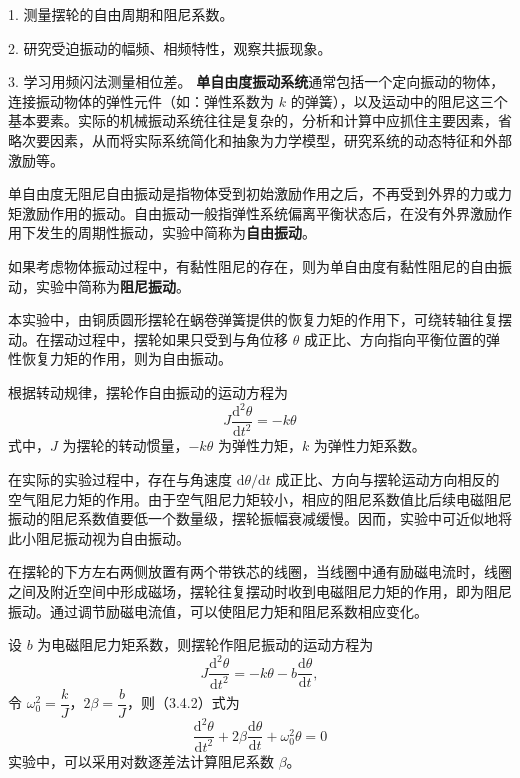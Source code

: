
\providecommand{\PlotCoordinates}[1]{(0,0)}
\fontsize{10.5pt}{20pt}\selectfont
{}
1. 测量摆轮的自由周期和阻尼系数。\par
2. 研究受迫振动的幅频、相频特性，观察共振现象。\par
3. 学习用频闪法测量相位差。
\textbf{单自由度振动系统}通常包括一个定向振动的物体，连接振动物体的弹性元件（如：弹性系数为 $k$ 的弹簧），以及运动中的阻尼这三个基本要素。实际的机械振动系统往往是复杂的，分析和计算中应抓住主要因素，省略次要因素，从而将实际系统简化和抽象为力学模型，研究系统的动态特征和外部激励等。

单自由度无阻尼自由振动是指物体受到初始激励作用之后，不再受到外界的力或力矩激励作用的振动。自由振动一般指弹性系统偏离平衡状态后，在没有外界激励作用下发生的周期性振动，实验中简称为\textbf{自由振动}。

如果考虑物体振动过程中，有黏性阻尼的存在，则为单自由度有黏性阻尼的自由振动，实验中简称为\textbf{阻尼振动}。

本实验中，由铜质圆形摆轮在蜗卷弹簧提供的恢复力矩的作用下，可绕转轴往复摆动。在摆动过程中，摆轮如果只受到与角位移 $\theta$ 成正比、方向指向平衡位置的弹性恢复力矩的作用，则为自由振动。

根据转动规律，摆轮作自由振动的运动方程为
\begin{equation}
J\frac{\mathrm{d}^2\theta}{\mathrm{d}t^2}=-k\theta
\tag{3.4.1}
\end{equation}
式中，$J$ 为摆轮的转动惯量，$-k\theta$ 为弹性力矩，$k$ 为弹性力矩系数。

在实际的实验过程中，存在与角速度 $\mathrm{d}\theta/\mathrm{d}t$ 成正比、方向与摆轮运动方向相反的空气阻尼力矩的作用。由于空气阻尼力矩较小，相应的阻尼系数值比后续电磁阻尼振动的阻尼系数值要低一个数量级，摆轮振幅衰减缓慢。因而，实验中可近似地将此小阻尼振动视为自由振动。

在摆轮的下方左右两侧放置有两个带铁芯的线圈，当线圈中通有励磁电流时，线圈之间及附近空间中形成磁场，摆轮往复摆动时收到电磁阻尼力矩的作用，即为阻尼振动。通过调节励磁电流值，可以使阻尼力矩和阻尼系数相应变化。

设 $b$ 为电磁阻尼力矩系数，则摆轮作阻尼振动的运动方程为
\begin{equation}
J\frac{\mathrm{d}^2\theta}{\mathrm{d}t^2}=-k\theta-b\frac{\mathrm{d}\theta}{\mathrm{d}t},
\tag{3.4.2}
\end{equation}
令 $\omega_0^2=\dfrac{k}{J}$，$2\beta=\dfrac{b}{J}$，则（3.4.2）式为
\begin{equation}
\frac{\mathrm{d}^2\theta}{\mathrm{d}t^2}+2\beta\frac{\mathrm{d}\theta}{\mathrm{d}t}+\omega_0^2\theta=0
\tag{3.4.3}
\end{equation}
实验中，可以采用对数逐差法计算阻尼系数 $\beta$。

